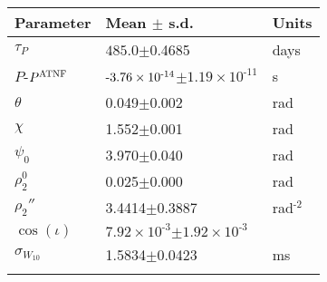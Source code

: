 \begin{tabular}{lll} \hhline{===}
        Parameter & Mean $\pm$ s.d. &  Units\\ \hline
$\tau_{P}$ & $485.0$$\pm$0.4685 & days\\
$P$\textrm{-}$P^{\tiny\textrm{ATNF}}$
 & ${\text{\textrm{-}}3.76}\times 10^{\textrm{-}14}$$\pm$${1.19}\times 10^{\textrm{-}11}$ & s\\
$\theta$ & 0.049$\pm$0.002 & rad\\
$\chi$ & 1.552$\pm$0.001 & rad\\
$\psi_0$ & 3.970$\pm$0.040 & rad\\
$\rho_{2}^{0}$ & 0.025$\pm$0.000 & rad\\
$\rho_{2}''$ & 3.4414$\pm$0.3887 & rad$^{\textrm{-}2}$\\
$\cos(\iota)$ & ${7.92}\times 10^{\textrm{-}3}$$\pm$${1.92}\times 10^{\textrm{-}3}$ & \\
$\sigma_{W_{10}}$ & 1.5834$\pm$0.0423 & ms\\
\hhline{===}
\end{tabular}